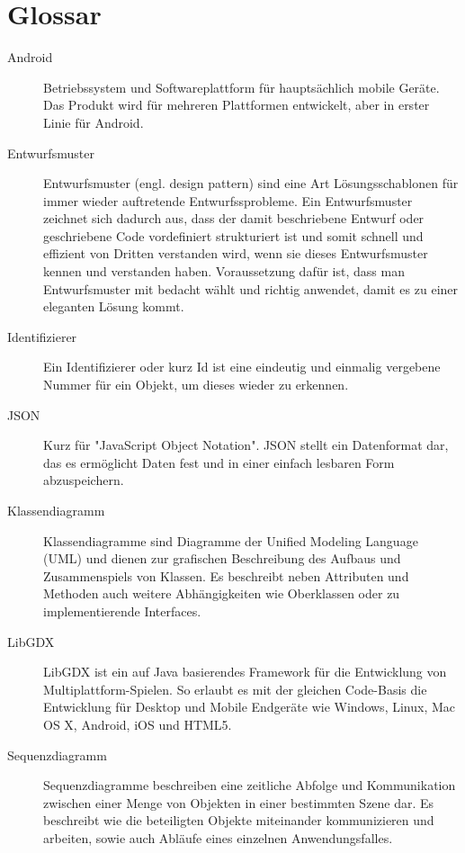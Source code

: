 \section{Glossar}
\begin{description}

\item[Android]
Betriebssystem und Softwareplattform für hauptsächlich mobile Geräte.
Das Produkt wird für mehreren Plattformen entwickelt, aber in erster Linie für Android.

\item[Entwurfsmuster]
Entwurfsmuster (engl. design pattern) sind eine Art Lösungsschablonen für immer wieder auftretende Entwurfssprobleme. Ein Entwurfsmuster zeichnet sich dadurch aus, dass der damit beschriebene Entwurf oder geschriebene Code vordefiniert strukturiert ist und somit schnell und effizient von Dritten verstanden wird, wenn sie dieses Entwurfsmuster kennen und verstanden haben. Voraussetzung dafür ist, dass man Entwurfsmuster mit bedacht wählt und richtig anwendet, damit es zu einer eleganten Lösung kommt.

\item[Identifizierer]
Ein Identifizierer oder kurz Id ist eine eindeutig und einmalig vergebene Nummer für ein Objekt, um dieses wieder zu erkennen.

\item[JSON]
Kurz für "JavaScript Object Notation". JSON stellt ein Datenformat dar, das es ermöglicht Daten fest und in einer einfach lesbaren Form abzuspeichern.

\item[Klassendiagramm]
Klassendiagramme sind Diagramme der Unified Modeling Language (UML) und dienen zur grafischen Beschreibung des Aufbaus und Zusammenspiels von Klassen.
Es beschreibt neben Attributen und Methoden auch weitere Abhängigkeiten wie Oberklassen oder zu implementierende Interfaces.

\item[LibGDX]
LibGDX ist ein auf Java basierendes Framework für die Entwicklung von Multiplattform-Spielen. So erlaubt es mit der gleichen Code-Basis die Entwicklung für Desktop und Mobile Endgeräte wie Windows, Linux, Mac OS X, Android, iOS und HTML5. 

\item[Sequenzdiagramm]
Sequenzdiagramme beschreiben eine zeitliche Abfolge und Kommunikation zwischen einer Menge von Objekten in einer bestimmten Szene dar. Es beschreibt wie die beteiligten Objekte miteinander kommunizieren und arbeiten, sowie auch Abläufe eines einzelnen Anwendungsfalles.


\end{description}
